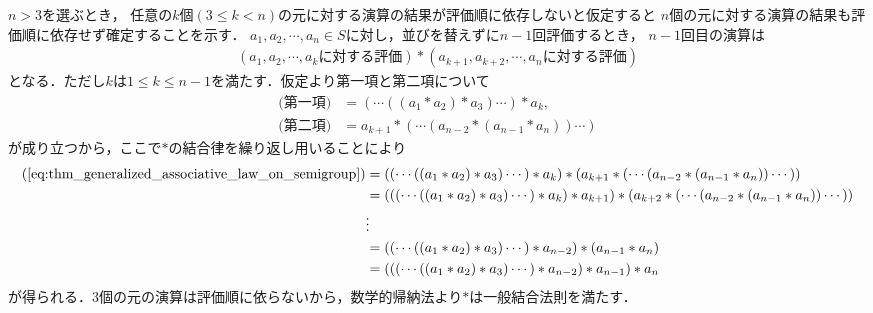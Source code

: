	\begin{prf}
		$n > 3$を選ぶとき，
		任意の$k$個$(3 \leq k < n)$の元に対する演算の結果が評価順に依存しないと仮定すると
		$n$個の元に対する演算の結果も評価順に依存せず確定することを示す．
		$a_1,a_2,\cdots,a_n \in S$に対し，並びを替えずに$n-1$回評価するとき，
		$n-1$回目の演算は
		\begin{align}
			(\mbox{$a_1,a_2,\cdots,a_k$に対する評価}) \ast
			(\mbox{$a_{k+1},a_{k+2},\cdots,a_n$に対する評価})
			\label{eq:thm_generalized_associative_law_on_semigroup}
		\end{align}
		となる．ただし$k$は$1 \leq k \leq n-1$を満たす．仮定より第一項と第二項について
		\begin{align}
			\mbox{(第一項)} &= (\cdots((a_1 \ast a_2) \ast a_3)\cdots) \ast a_k, \\
			\mbox{(第二項)} &= a_{k+1} \ast (\cdots(a_{n-2} \ast (a_{n-1} \ast a_n))\cdots)
		\end{align}
		が成り立つから，ここで$\ast$の結合律を繰り返し用いることにより
		\begin{align}
			(\refeq{eq:thm_generalized_associative_law_on_semigroup}) 
			&= ((\cdots((a_1 \ast a_2) \ast a_3)\cdots) \ast a_k) \ast (a_{k+1} \ast (\cdots(a_{n-2} \ast (a_{n-1} \ast a_n))\cdots)) \\
			&= (((\cdots((a_1 \ast a_2) \ast a_3)\cdots) \ast a_k) \ast a_{k+1}) \ast (a_{k+2} \ast (\cdots(a_{n-2} \ast (a_{n-1} \ast a_n))\cdots)) \\
			&\vdots \\
			&= ((\cdots((a_1 \ast a_2) \ast a_3)\cdots) \ast a_{n-2}) \ast (a_{n-1} \ast a_n) \\
			&= (((\cdots((a_1 \ast a_2) \ast a_3)\cdots) \ast a_{n-2}) \ast a_{n-1}) \ast a_n
		\end{align}
		が得られる．$3$個の元の演算は評価順に依らないから，数学的帰納法より$\ast$は一般結合法則を満たす．
		\QED
	\end{prf}